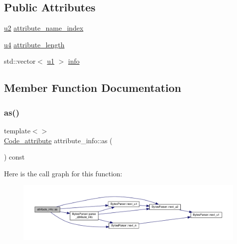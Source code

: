 \subsection*{Public Attributes}
\begin{DoxyCompactItemize}
\item 
\hyperlink{types_8h_ae676e9207f57fb921dca7366b2f59c53}{u2} \hyperlink{structattribute__info_a19df9d4b42eb55ca5dc1bed98df89378}{attribute\+\_\+name\+\_\+index}
\item 
\hyperlink{types_8h_af3b2d4b29fd9faedc984db3e062b3d5d}{u4} \hyperlink{structattribute__info_a1ed8f679458c4bb0ed3315721588f50d}{attribute\+\_\+length}
\item 
std\+::vector$<$ \hyperlink{types_8h_a162f47a77ee24f6f77cd8c82ccd40ab7}{u1} $>$ \hyperlink{structattribute__info_a6a539f32a00eeace6eea454ca37768fd}{info}
\end{DoxyCompactItemize}


\subsection{Member Function Documentation}
\mbox{\label{structattribute__info_a22251f0b4f95aabf0fc722ca80651d88}} 
\subsubsection{\texorpdfstring{as()}{as()}\hspace{0.1cm}{\footnotesize\ttfamily [1/2]}}
{\footnotesize\ttfamily template$<$$>$ \\
\hyperlink{structCode__attribute}{Code\+\_\+attribute} attribute\+\_\+info\+::as (\begin{DoxyParamCaption}{ }\end{DoxyParamCaption}) const}

Here is the call graph for this function\+:\nopagebreak
\begin{figure}[H]
\begin{center}
\leavevmode
\includegraphics[width=350pt]{structattribute__info_a22251f0b4f95aabf0fc722ca80651d88_cgraph}
\end{center}
\end{figure}
\mbox{\label{structattribute__info_ace33b133435450d7d161751a3393de11}} 
